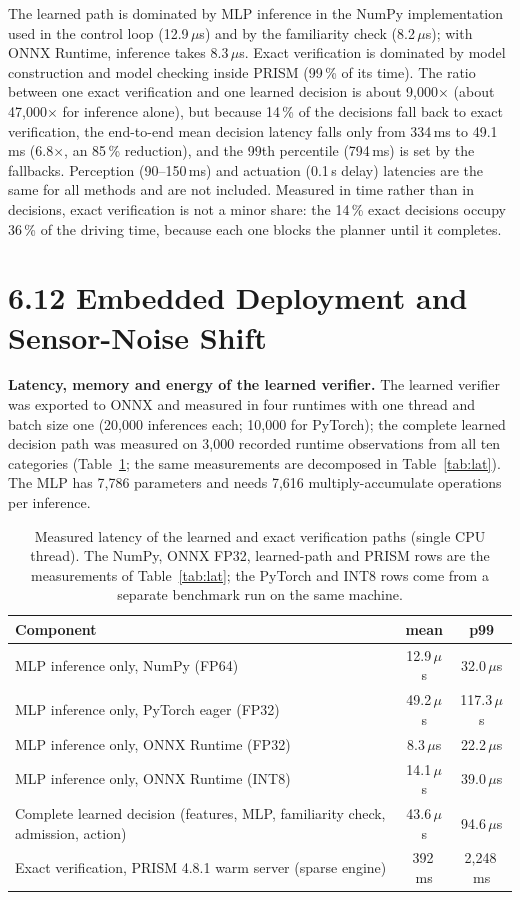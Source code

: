 \documentclass[11pt]{article}
\begin{document}
The learned path is dominated by MLP inference in the NumPy implementation used in the control loop (12.9\,$\mu$s) and by the familiarity check (8.2\,$\mu$s); with ONNX Runtime, inference takes 8.3\,$\mu$s. Exact verification is dominated by model construction and model checking inside PRISM (99\,\% of its time). The ratio between one exact verification and one learned decision is about 9,000$\times$ (about 47,000$\times$ for inference alone), but because 14\,\% of the decisions fall back to exact verification, the end-to-end mean decision latency falls only from 334\,ms to 49.1\,ms (6.8$\times$, an 85\,\% reduction), and the 99th percentile (794\,ms) is set by the fallbacks. Perception (90--150\,ms) and actuation (0.1\,s delay) latencies are the same for all methods and are not included. Measured in time rather than in decisions, exact verification is not a minor share: the 14\,\% exact decisions occupy 36\,\% of the driving time, because each one blocks the planner until it completes.

\clearpage
\section*{6.12 \quad Embedded Deployment and Sensor-Noise Shift}
\textbf{Latency, memory and energy of the learned verifier.} The learned verifier was exported to ONNX and measured in four runtimes with one
thread and batch size one (20,000 inferences each; 10,000 for PyTorch); the complete learned decision path was measured on 3,000 recorded runtime observations
from all ten categories (Table~\ref{tab:emb}; the same measurements are decomposed in Table~\ref{tab:lat}). The MLP has 7,786 parameters and needs 7,616 multiply-accumulate operations per
inference.

\begin{table}[h]
\centering\small
\caption{Measured latency of the learned and exact verification paths (single CPU thread). The NumPy, ONNX FP32, learned-path and PRISM rows are the
measurements of Table~\ref{tab:lat}; the PyTorch and INT8 rows come from a separate benchmark run on the same machine.}\label{tab:emb}
\begin{tabular}{lcc}
\toprule
Component & mean & p99 \\
\midrule
MLP inference only, NumPy (FP64) & 12.9\,$\mu$s & 32.0\,$\mu$s \\
MLP inference only, PyTorch eager (FP32) & 49.2\,$\mu$s & 117.3\,$\mu$s \\
MLP inference only, ONNX Runtime (FP32) & 8.3\,$\mu$s & 22.2\,$\mu$s \\
MLP inference only, ONNX Runtime (INT8) & 14.1\,$\mu$s & 39.0\,$\mu$s \\
Complete learned decision (features, MLP, familiarity check, admission, action) & 43.6\,$\mu$s & 94.6\,$\mu$s \\
Exact verification, PRISM 4.8.1 warm server (sparse engine) & 392\,ms & 2,248\,ms \\
\bottomrule
\end{tabular}
\end{table}
\end{document}
